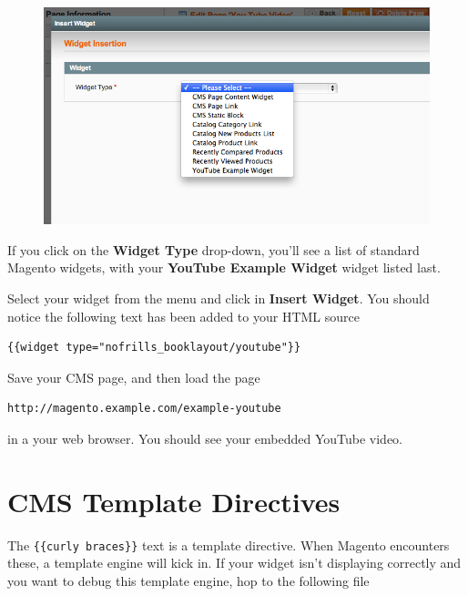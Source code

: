 \documentclass[oneside]{book}
\begin{document}
\begin{figure}[htb]
\begin{center}
\leavevmode
\includegraphics[width=1\textwidth]{images/chapter7/widget-window.png}
\end{center}
\caption{}
\end{figure}


If you click on the \textbf{Widget Type} drop-down, you'll see a list of standard Magento widgets, with your \textbf{YouTube Example Widget} widget listed last.

Select your widget from the menu and click in \textbf{Insert Widget}.  You should notice the following text has been added to your HTML source

\begin{lstlisting}
{{widget type="nofrills_booklayout/youtube"}}

\end{lstlisting}


Save your CMS page, and then load the page

\begin{lstlisting}
http://magento.example.com/example-youtube

\end{lstlisting}


in a your web browser.   You should see your embedded YouTube video.

\section{CMS Template Directives}

The \footnotesize\texttt{\{\{curly braces\}\}} \normalsize  text is a template directive.  When Magento encounters these, a template engine will kick in.  If your widget isn't displaying correctly and you want to debug this template engine, hop to the following file
\end{document}
